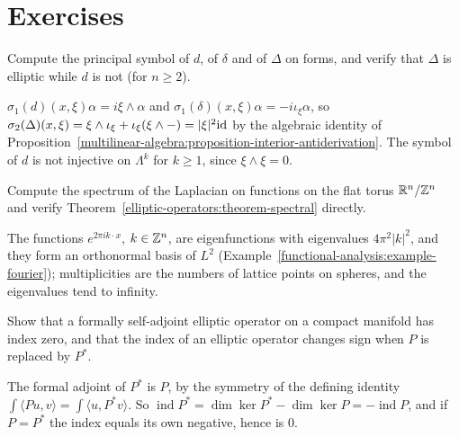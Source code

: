 \section{Exercises}\label{elliptic-operators:section-exercises}

\begin{exercise}\label{elliptic-operators:exercise-symbol-laplacian}
Compute the principal symbol of $d$, of $\delta$ and of $\Delta$ on forms, and verify that $\Delta$ is elliptic while $d$ is not (for $n \geq 2$).
\end{exercise}

\begin{solution}
$\sigma_1(d)(x, \xi)\alpha = i\xi \wedge \alpha$ and $\sigma_1(\delta)(x, \xi)\alpha = -i\iota_\xi\alpha$, so
$\sigma_2(\Delta)(x, \xi) = \xi \wedge \iota_\xi + \iota_\xi(\xi \wedge -) = |\xi|^2\mathrm{id}$ by the algebraic identity of
Proposition~\ref{multilinear-algebra:proposition-interior-antiderivation}. The symbol of $d$ is not injective on $\Lambda^k$ for $k \geq 1$, since $\xi \wedge \xi = 0$.
\end{solution}

\begin{exercise}\label{elliptic-operators:exercise-eigenvalues-torus}
Compute the spectrum of the Laplacian on functions on the flat torus $\mathbb{R}^n/\mathbb{Z}^n$ and verify Theorem~\ref{elliptic-operators:theorem-spectral} directly.
\end{exercise}

\begin{solution}
The functions $e^{2\pi ik\cdot x}$, $k \in \mathbb{Z}^n$, are eigenfunctions with eigenvalues $4\pi^2|k|^2$, and they form an orthonormal basis of $L^2$
(Example~\ref{functional-analysis:example-fourier}); multiplicities are the numbers of lattice points on spheres, and the eigenvalues tend to infinity.
\end{solution}

\begin{exercise}\label{elliptic-operators:exercise-index-self-adjoint}
Show that a formally self-adjoint elliptic operator on a compact manifold has index zero, and that the index of an elliptic operator changes sign when $P$ is replaced by $P^*$.
\end{exercise}

\begin{solution}
The formal adjoint of $P^*$ is $P$, by the symmetry of the defining identity $\int\langle Pu, v\rangle = \int\langle u, P^*v\rangle$. So
$\operatorname{ind}P^* = \dim\ker P^* - \dim\ker P = -\operatorname{ind}P$, and if $P = P^*$ the index equals its own negative, hence is $0$.
\end{solution}

